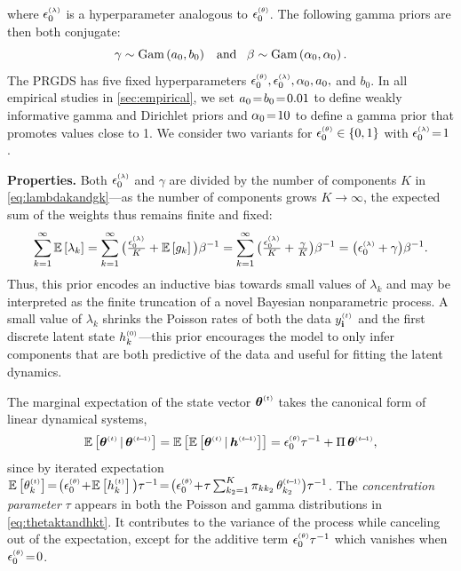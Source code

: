 \documentclass{article}
\begin{document}
where $\epslambda$ is a hyperparameter analogous to $\epstheta$. The following gamma priors are then both conjugate:~
\begin{equation}
\gamma \sim \textrm{Gam}\left( a_0,b_0 \right) \,\,\,\textrm{ and }\,\,\, \beta \sim \textrm{Gam}\left( \alpha_0, \alpha_0 \right).
\end{equation}
The PRGDS has five fixed hyperparameters $\epstheta,\epslambda,\alpha_0,a_0,$ and $b_0$. In all empirical studies in \cref{sec:empirical}, we set $a_0\!=\! b_0 \!=\! 0.01$ to define weakly informative gamma and Dirichlet priors and $\alpha_0 \!=\! 10$ to define a gamma prior that promotes values close to 1. We consider two variants for $\epstheta \in \{0,1\}$ with $\epslambda \teq 1$.~

\textbf{Properties.}
Both $\epslambda$ and $\gamma$ are divided by the number of components $K$ in \cref{eq:lambdakandgk}---as the number of components grows $K \!\rightarrow\! \infty$, the expected sum of the weights thus remains finite and fixed:~
\begin{equation}
\sum_{k=1}^\infty \E{\lambda_k} = \sum_{k=1}^\infty \big(\tfrac{\epslambda}{K} + \E{g_k}\big) \beta^{-1} = \sum_{k=1}^\infty \big(\tfrac{\epslambda}{K} + \tfrac{\gamma}{K} \big)\beta^{-1} = \big(\epslambda + \gamma \big)\beta^{-1}.
\end{equation}
Thus, this prior encodes an inductive bias towards small values of $\lambda_k$ and may be interpreted as the finite truncation of a novel Bayesian nonparametric process. A small value of $\lambda_k$ shrinks the Poisson rates of both the data $\ydt$ and the first discrete latent state $h^{\mathsmaller{(0)}}_k$---this prior encourages the model to only infer components that are both predictive of the data and useful for fitting the latent dynamics.~

The marginal expectation of the state vector $\boldsymbol{\theta}^{\mathsmaller{(t)}}$ takes the canonical form of linear dynamical systems,~
\begin{align}
\label{eq:expectation}
\mathbb{E}\left[\boldsymbol{\theta}^{\mathsmaller{(t)}} \given \boldsymbol{\theta}^{\mathsmaller{(t \tm 1)}}\right] = \mathbb{E}\left[\mathbb{E}\left[\boldsymbol{\theta}^{\mathsmaller{(t)}} \given \boldsymbol{h}^{\mathsmaller{(t \tm 1)}}\right]\right] = \epstheta \tau^{-1} + \Pi \, \boldsymbol{\theta}^{\mathsmaller{(t \tm 1)}},
\end{align}
since by iterated expectation $\E{\thetakt} \teq \big(\epstheta \tp \E{\hkt}\big)\tau^{-1} \teq \big(\epstheta \tp \tau \sum_{k_2 = 1}^K \pi_{kk_2} \,\thetakttm \big) \tau^{-1}$. The \emph{concentration parameter} $\tau$ appears in both the Poisson and gamma distributions in \cref{eq:thetaktandhkt}. It contributes to the variance of the process while canceling out of the expectation, except for the additive term $\epstheta \tau^{-1}$ which vanishes when $\epstheta \teq 0$.
\end{document}

